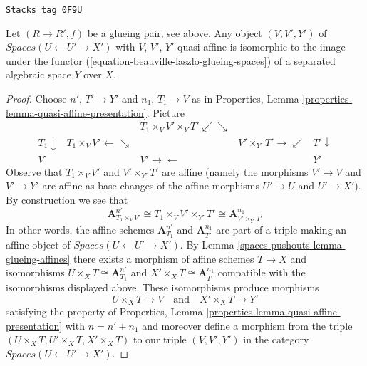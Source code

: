 \begin{lemma}
\label{spaces-pushouts-lemma-glueing-quasi-affines}
\href{https://stacks.math.columbia.edu/tag/0F9U}{\texttt{Stacks tag 0F9U}}

Let $(R \to R', f)$ be a glueing pair, see above. Any object
$(V, V', Y')$ of $\textit{Spaces}(U \leftarrow U' \to X')$
with $V$, $V'$, $Y'$ quasi-affine is isomorphic to
the image under the functor (\ref{equation-beauville-laszlo-glueing-spaces})
of a separated algebraic space $Y$ over $X$.
\end{lemma}

\begin{proof}
Choose $n'$, $T' \to Y'$ and $n_1$, $T_1 \to V$ as in
Properties, Lemma \ref{properties-lemma-quasi-affine-presentation}.
Picture
$$
\begin{array}{ccccc} &  & T_1 \times_V V' \times_Y T' \swarrow\searrow &  &  \\ T_1 \downarrow & T_1 \times_V V' \longleftarrow\searrow &  & V' \times_{Y'} T' \longrightarrow\swarrow & T' \downarrow \\ V &  & V' \longrightarrow\longleftarrow &  & Y'\end{array}
$$
Observe that $T_1 \times_V V'$ and $V' \times_{Y'} T'$
are affine (namely the morphisms $V' \to V$ and $V' \to Y'$
are affine as base changes of the affine morphisms $U' \to U$
and $U' \to X'$). By construction we see that
$$
\mathbf{A}^{n'}_{T_1 \times_V V'} \cong
T_1 \times_V V' \times_{Y'} T' \cong
\mathbf{A}^{n_1}_{V' \times_{Y'} T'}
$$
In other words, the affine schemes $\mathbf{A}^{n'}_{T_1}$
and $\mathbf{A}^{n_1}_{T'}$ are part of a triple making an affine object of
$\textit{Spaces}(U \leftarrow U' \to X')$.
By Lemma \ref{spaces-pushouts-lemma-glueing-affines}
there exists a morphism of affine schemes $T \to X$
and isomorphisms $U \times_X T \cong \mathbf{A}^{n'}_{T_1}$
and $X' \times_X T \cong \mathbf{A}^{n_1}_{T'}$ compatible
with the isomorphisms displayed above.
These isomorphisms produce morphisms
$$
U \times_X T \longrightarrow V
\quad\text{and}\quad
X' \times_X T \longrightarrow Y'
$$
satisfying the property of
Properties, Lemma \ref{properties-lemma-quasi-affine-presentation}
with $n = n' + n_1$ and moreover define a morphism from the triple
$(U \times_X T, U' \times_X T, X' \times_X T)$ to
our triple $(V, V', Y')$ in the category
$\textit{Spaces}(U \leftarrow U' \to X')$.


\end{proof}
